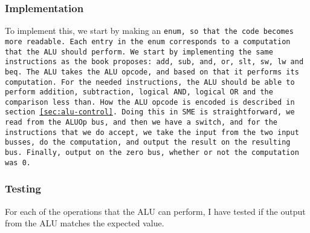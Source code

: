\subsubsection*{Implementation}
To implement this, we start by making an \tt{enum}, so that the code becomes
more readable. Each entry in the \tt{enum} corresponds to a computation that
the ALU should perform. We start by implementing the same instructions as the
book proposes:  %
\texttt{add}, \texttt{sub}, \texttt{and}, \texttt{or}, \texttt{slt},
\texttt{sw}, \texttt{lw} and \texttt{beq}. The ALU takes the ALU opcode, and
based on that it performs its computation. For the needed instructions, the ALU
should be able to perform addition, subtraction, logical \tt{AND}, logical
\tt{OR} and the comparison less than. How the ALU opcode is encoded is
described in section \ref{sec:alu-control}.  Doing this in SME is
straightforward, we read from the ALUOp bus, and then we have a
\texttt{switch}, and for the instructions that we do accept, we take the input
from the two input busses, do the computation, and output the result on the
resulting bus. Finally, output on the zero bus, whether or not the computation
was 0.

\subsubsection*{Testing}
For each of the operations that the ALU can perform, I have tested if the
output from the ALU matches the expected value.

